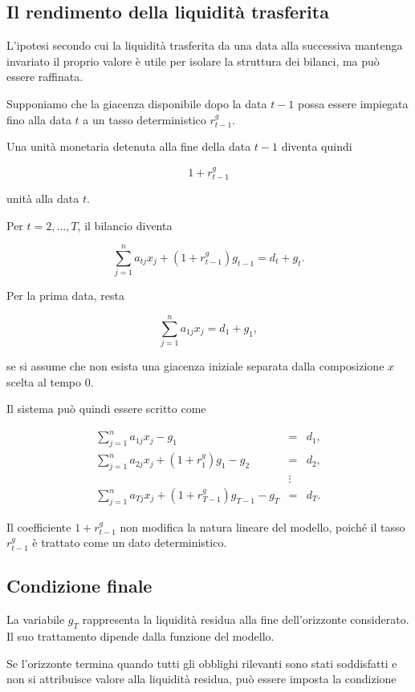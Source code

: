 \subsection{Il rendimento della liquidit\`a trasferita}

L'ipotesi secondo cui la liquidit\`a trasferita da una data alla successiva
mantenga invariato il proprio valore \`e utile per isolare la struttura dei
bilanci, ma pu\`o essere raffinata.

Supponiamo che la giacenza disponibile dopo la data $t-1$ possa essere
impiegata fino alla data $t$ a un tasso deterministico $r^g_{t-1}$.

Una unit\`a monetaria detenuta alla fine della data $t-1$ diventa quindi

\[
1+r^g_{t-1}
\]

\noindent unit\`a alla data $t$.

Per $t=2,\ldots,T$, il bilancio diventa

\[
\sum_{j=1}^{n}a_{tj}x_j
+
(1+r^g_{t-1})g_{t-1}
=
d_t+g_t.
\]

Per la prima data, resta

\[
\sum_{j=1}^{n}a_{1j}x_j
=
d_1+g_1,
\]

\noindent se si assume che non esista una giacenza iniziale separata dalla composizione
$x$ scelta al tempo $0$.

Il sistema pu\`o quindi essere scritto come

\[
\begin{array}{rcl}
\displaystyle
\sum_{j=1}^{n}a_{1j}x_j-g_1
&=&
d_1,
\\[8pt]
\displaystyle
\sum_{j=1}^{n}a_{2j}x_j
+
(1+r_1^{g})g_1-g_2
&=&
d_2,
\\
&\vdots&
\\
\displaystyle
\sum_{j=1}^{n}a_{Tj}x_j
+
(1+r_{T-1}^{g})g_{T-1}-g_T
&=&
d_T.
\end{array}
\]

Il coefficiente $1+r^g_{t-1}$ non modifica la natura lineare del modello,
poich\'e il tasso $r^g_{t-1}$ \`e trattato come un dato deterministico.

\subsection{Condizione finale}

La variabile $g_T$ rappresenta la liquidit\`a residua alla fine
dell'orizzonte considerato. Il suo trattamento dipende dalla funzione del
modello.

Se l'orizzonte termina quando tutti gli obblighi rilevanti sono stati
soddisfatti e non si attribuisce valore alla liquidit\`a residua, pu\`o essere
imposta la condizione

